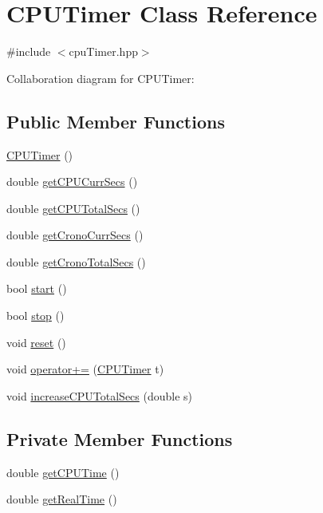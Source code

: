\hypertarget{class_c_p_u_timer}{}\section{C\+P\+U\+Timer Class Reference}
\label{class_c_p_u_timer}


{\ttfamily \#include $<$cpu\+Timer.\+hpp$>$}



Collaboration diagram for C\+P\+U\+Timer\+:
\subsection*{Public Member Functions}
\begin{DoxyCompactItemize}
\item 
\hyperlink{class_c_p_u_timer_aa06f8e13b3c82bbb8642f4981bfff7e7}{C\+P\+U\+Timer} ()
\item 
double \hyperlink{class_c_p_u_timer_a98f96656fd5e6676064ac6e5f3c7621b}{get\+C\+P\+U\+Curr\+Secs} ()
\item 
double \hyperlink{class_c_p_u_timer_a9547512dbcec01ea685d291569a87aa4}{get\+C\+P\+U\+Total\+Secs} ()
\item 
double \hyperlink{class_c_p_u_timer_a363d9ba80f897fe24914cce080bf3b52}{get\+Crono\+Curr\+Secs} ()
\item 
double \hyperlink{class_c_p_u_timer_aa8736023dbfa50166f8e49960ad84a84}{get\+Crono\+Total\+Secs} ()
\item 
bool \hyperlink{class_c_p_u_timer_a8712b4f64c79a210e91bbb72ed55bfc1}{start} ()
\item 
bool \hyperlink{class_c_p_u_timer_afc986e87c38afb37b7911f8424726d1d}{stop} ()
\item 
void \hyperlink{class_c_p_u_timer_ae9c1b873923f73091dae7e5a6051baf6}{reset} ()
\item 
void \hyperlink{class_c_p_u_timer_ab11c8b37836afcacfc60341cfa6f21b3}{operator+=} (\hyperlink{class_c_p_u_timer}{C\+P\+U\+Timer} t)
\item 
void \hyperlink{class_c_p_u_timer_abbb38873f4469d55406a3c00816590b0}{increase\+C\+P\+U\+Total\+Secs} (double s)
\end{DoxyCompactItemize}
\subsection*{Private Member Functions}
\begin{DoxyCompactItemize}
\item 
double \hyperlink{class_c_p_u_timer_a3403f8cce7b7518e47a1826b8650220c}{get\+C\+P\+U\+Time} ()
\item 
double \hyperlink{class_c_p_u_timer_a57da0f833904f3ddf20a640e0f8fe127}{get\+Real\+Time} ()
\end{DoxyCompactItemize}
